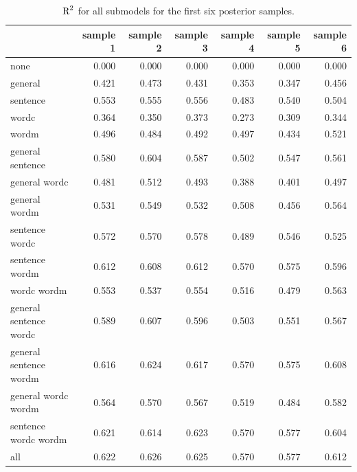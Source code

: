 \documentclass[11pt,a4paper,twoside]{book}\usepackage[]{graphicx}\usepackage[]{color}
\newenvironment{knitrout}{}{} %
\begin{document}
\begin{knitrout}
\color{fgcolor}\begin{table}

\caption{\label{tab:empirical.data.postsample3}$ \text{R}^2$ for all submodels for the first six posterior samples.}
\centering
\begin{tabular}[t]{lrrrrrr}
\toprule
  & sample 1 & sample 2 & sample 3 & sample 4 & sample 5 & sample 6\\
\midrule
none & 0.000 & 0.000 & 0.000 & 0.000 & 0.000 & 0.000\\
general & 0.421 & 0.473 & 0.431 & 0.353 & 0.347 & 0.456\\
sentence & 0.553 & 0.555 & 0.556 & 0.483 & 0.540 & 0.504\\
wordc & 0.364 & 0.350 & 0.373 & 0.273 & 0.309 & 0.344\\
wordm & 0.496 & 0.484 & 0.492 & 0.497 & 0.434 & 0.521\\
general sentence & 0.580 & 0.604 & 0.587 & 0.502 & 0.547 & 0.561\\
general wordc & 0.481 & 0.512 & 0.493 & 0.388 & 0.401 & 0.497\\
general wordm & 0.531 & 0.549 & 0.532 & 0.508 & 0.456 & 0.564\\
sentence wordc & 0.572 & 0.570 & 0.578 & 0.489 & 0.546 & 0.525\\
sentence wordm & 0.612 & 0.608 & 0.612 & 0.570 & 0.575 & 0.596\\
wordc wordm & 0.553 & 0.537 & 0.554 & 0.516 & 0.479 & 0.563\\
general sentence wordc & 0.589 & 0.607 & 0.596 & 0.503 & 0.551 & 0.567\\
general sentence wordm & 0.616 & 0.624 & 0.617 & 0.570 & 0.575 & 0.608\\
general wordc wordm & 0.564 & 0.570 & 0.567 & 0.519 & 0.484 & 0.582\\
sentence wordc wordm & 0.621 & 0.614 & 0.623 & 0.570 & 0.577 & 0.604\\
all & 0.622 & 0.626 & 0.625 & 0.570 & 0.577 & 0.612\\
\bottomrule
\end{tabular}
\end{table}


\end{knitrout}
\end{document}
